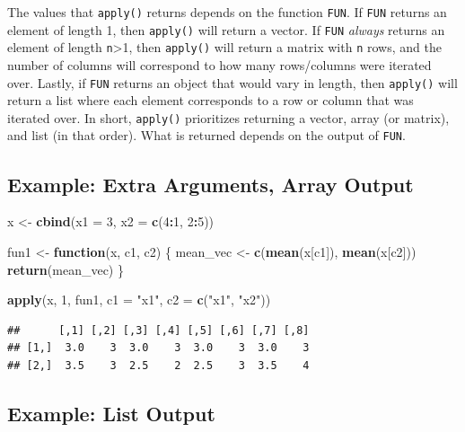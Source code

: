 \documentclass[
]{book}
\newenvironment{Shaded}{\begin{snugshade}}{\end{snugshade}}
\newcommand{\ControlFlowTok}[1]{\textcolor[rgb]{0.13,0.29,0.53}{\textbf{#1}}}
\newcommand{\DataTypeTok}[1]{\textcolor[rgb]{0.13,0.29,0.53}{#1}}
\newcommand{\DecValTok}[1]{\textcolor[rgb]{0.00,0.00,0.81}{#1}}
\newcommand{\KeywordTok}[1]{\textcolor[rgb]{0.13,0.29,0.53}{\textbf{#1}}}
\newcommand{\NormalTok}[1]{#1}
\newcommand{\OperatorTok}[1]{\textcolor[rgb]{0.81,0.36,0.00}{\textbf{#1}}}
\newcommand{\StringTok}[1]{\textcolor[rgb]{0.31,0.60,0.02}{#1}}
\begin{document}
The values that \texttt{apply()} returns depends on the function \texttt{FUN}. If \texttt{FUN} returns an element of length 1, then \texttt{apply()} will return a vector. If \texttt{FUN} \emph{always} returns an element of length \texttt{n}\textgreater1, then \texttt{apply()} will return a matrix with \texttt{n} rows, and the number of columns will correspond to how many rows/columns were iterated over. Lastly, if \texttt{FUN} returns an object that would vary in length, then \texttt{apply()} will return a list where each element corresponds to a row or column that was iterated over. In short, \texttt{apply()} prioritizes returning a vector, array (or matrix), and list (in that order). What is returned depends on the output of \texttt{FUN}.

\hypertarget{example-extra-arguments-array-output}{%
\subsection{Example: Extra Arguments, Array Output}\label{example-extra-arguments-array-output}}

\begin{Shaded}
\begin{Highlighting}[]
\NormalTok{x <-}\StringTok{ }\KeywordTok{cbind}\NormalTok{(}\DataTypeTok{x1 =} \DecValTok{3}\NormalTok{, }\DataTypeTok{x2 =} \KeywordTok{c}\NormalTok{(}\DecValTok{4}\OperatorTok{:}\DecValTok{1}\NormalTok{, }\DecValTok{2}\OperatorTok{:}\DecValTok{5}\NormalTok{))}

\NormalTok{fun1 <-}\StringTok{ }\ControlFlowTok{function}\NormalTok{(x, c1, c2) \{}
\NormalTok{    mean_vec <-}\StringTok{ }\KeywordTok{c}\NormalTok{(}\KeywordTok{mean}\NormalTok{(x[c1]), }\KeywordTok{mean}\NormalTok{(x[c2]))}
    \KeywordTok{return}\NormalTok{(mean_vec)}
\NormalTok{\}}

\KeywordTok{apply}\NormalTok{(x, }\DecValTok{1}\NormalTok{, fun1, }\DataTypeTok{c1 =} \StringTok{"x1"}\NormalTok{, }\DataTypeTok{c2 =} \KeywordTok{c}\NormalTok{(}\StringTok{"x1"}\NormalTok{, }\StringTok{"x2"}\NormalTok{))}
\end{Highlighting}
\end{Shaded}

\begin{verbatim}
##      [,1] [,2] [,3] [,4] [,5] [,6] [,7] [,8]
## [1,]  3.0    3  3.0    3  3.0    3  3.0    3
## [2,]  3.5    3  2.5    2  2.5    3  3.5    4
\end{verbatim}

\hypertarget{example-list-output}{%
\subsection{Example: List Output}\label{example-list-output}}
\end{document}
